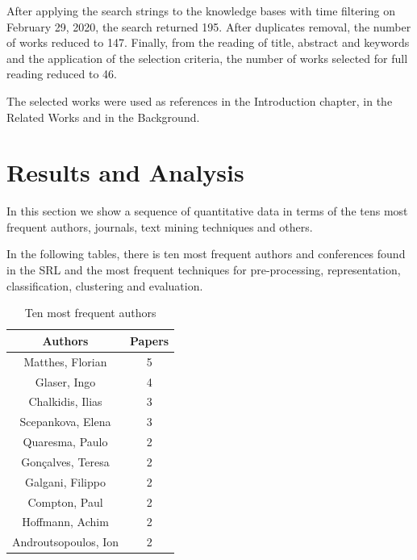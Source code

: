 After applying the search strings to the knowledge bases with time filtering on February 29, 2020, the search returned 195. After duplicates removal, the number of works reduced to 147. Finally, from the reading of title, abstract and keywords and the application of the selection criteria, the number of works selected for full reading reduced to 46.

The selected works were used as references in the Introduction chapter, in the Related Works and in the Background.

\section{Results and Analysis}
In this section we show a sequence of quantitative data in terms of the tens most frequent authors, journals, text mining techniques and others.

In the following tables, there is ten most frequent authors and conferences found in the SRL and the most frequent techniques for pre-processing, representation, classification, clustering and evaluation.



\begin{table}[H]
    \footnotesize
    \centering
    \caption{Ten most frequent authors}
    \label{tab:rsl_freq_authors}
    \begin{tabular}{@{}cc@{}}
    
    \toprule
    \textbf{Authors}     & \textbf{Papers} \\ \midrule
    Matthes, Florian     & 5               \\
    Glaser, Ingo         & 4               \\
    Chalkidis, Ilias     & 3               \\
    Scepankova, Elena    & 3               \\
    Quaresma, Paulo      & 2               \\
    Gonçalves, Teresa    & 2               \\
    Galgani, Filippo     & 2               \\
    Compton, Paul        & 2               \\
    Hoffmann, Achim      & 2               \\
    Androutsopoulos, Ion & 2               \\ \bottomrule
    
    \end{tabular}
\end{table}

